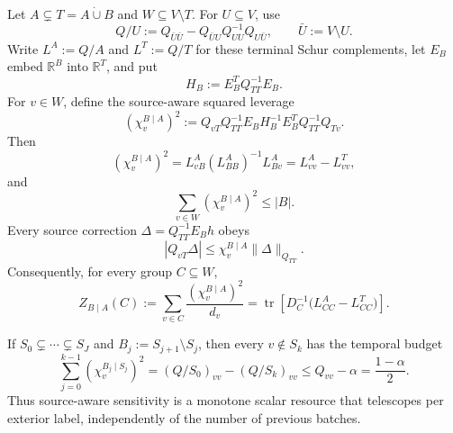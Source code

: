 \begin{theorem}
\label{thm:source-aware-schur-diagonal-loss}
Let $A\subsetneq T=A\mathbin{\dot\cup}B$ and
$W\subseteq V\setminus T$.  For $U\subseteq V$, use
\begin{equation*}
 Q/U:=Q_{\bar U\bar U}
       -Q_{\bar U U}Q_{UU}^{-1}Q_{U\bar U},
 \qquad \bar U:=V\setminus U.
\end{equation*}
Write $L^A:=Q/A$ and $L^T:=Q/T$ for these terminal Schur complements, let
$E_B$ embed $\mathbb R^B$ into $\mathbb R^T$, and put
\begin{equation*}
 H_B:=E_B^TQ_{TT}^{-1}E_B.
\end{equation*}
For $v\in W$, define the source-aware squared leverage
\begin{equation}
 (\chi_v^{B\mid A})^2
 :=Q_{vT}Q_{TT}^{-1}E_BH_B^{-1}
      E_B^TQ_{TT}^{-1}Q_{Tv}.
 \label{eq:source-aware-schur-leverage}
\end{equation}
Then
\begin{equation}
 (\chi_v^{B\mid A})^2
 =L^A_{vB}(L^A_{BB})^{-1}L^A_{Bv}
 =L^A_{vv}-L^T_{vv},
 \label{eq:source-aware-diagonal-identity}
\end{equation}
and
\begin{equation}
 \sum_{v\in W}(\chi_v^{B\mid A})^2\leq |B|.
 \label{eq:source-aware-rank-budget}
\end{equation}
Every source correction $\Delta=Q_{TT}^{-1}E_Bh$ obeys
\begin{equation}
 |Q_{vT}\Delta|
 \leq\chi_v^{B\mid A}\|\Delta\|_{Q_{TT}}.
 \label{eq:source-aware-response-interval}
\end{equation}
Consequently, for every group $C\subseteq W$,
\begin{equation}
 Z_{B\mid A}(C)
 :=\sum_{v\in C}\frac{(\chi_v^{B\mid A})^2}{d_v}
 =\operatorname{tr}\!\left[
  D_C^{-1}\bigl(L^A_{CC}-L^T_{CC}\bigr)
 \right].
 \label{eq:source-aware-group-diagonal-loss}
\end{equation}

If $S_0\subsetneq\cdots\subsetneq S_J$ and
$B_j:=S_{j+1}\setminus S_j$, then every $v\notin S_k$ has the temporal
budget
\begin{equation}
 \sum_{j=0}^{k-1}(\chi_v^{B_j\mid S_j})^2
 =(Q/S_0)_{vv}-(Q/S_k)_{vv}
 \leq Q_{vv}-\alpha
 =\frac{1-\alpha}{2}.
 \label{eq:source-aware-temporal-budget}
\end{equation}
Thus source-aware sensitivity is a monotone scalar resource that telescopes
per exterior label, independently of the number of previous batches.
\end{theorem}

